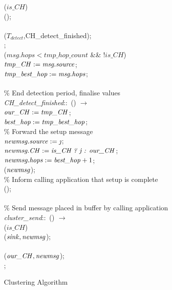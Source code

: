 \begin{figure}[H]
\begin{boxedminipage}{\linewidth}
    \null\qq\qq\qq {} ($is\_CH$)  \\
    \null\qq\qq\qq\qq {}(); \\
    \null\qq\qq\qq {}\\
    \null\qq\qq\qq\qq {}($T_{detect}$,CH\_detect\_finished); \\
    \null\qq\qq {}; \\
    \null\qq\qq {} ($msg.hops < tmp\_hop\_count$ \&\& !$is\_CH$)  \\
    \null\qq\qq\qq $\mbox{\emph{tmp\_CH}} \mathrel{:=} \mbox{\emph{msg.source}}$;\\
    \null\qq\qq\qq $\mbox{\emph{tmp\_best\_hop}} \mathrel{:=} \mbox{\emph{msg.hops}}$;\\~\\
    \null\qq \% End detection period, finalise values\\
    \null\qq \emph{CH\_detect\_finished}::~() $\rightarrow$\\
    \null\qq\qq $\mbox{\emph{our\_CH}} \mathrel{:=} \mbox{\emph{tmp\_CH}}$;\\
    \null\qq\qq $\mbox{\emph{best\_hop}} \mathrel{:=} \mbox{\emph{tmp\_best\_hop}}$;\\
    \null\qq\qq \% Forward the setup message\\
    \null\qq\qq $\var{newmsg.source} \assign \var{\j}$;\\
    \null\qq\qq $\mbox{\emph{newmsg.CH}} \mathrel{:=} \mbox{\emph{is\_CH ? j : our\_CH}}$;\\
    \null\qq\qq $\mbox{\emph{newmsg.hops}} \mathrel{:=} \mbox{\emph{best\_hop}}+1$;\\
    \null\qq\qq {}($\mbox{\emph{newmsg}}$);\\
    \null\qq\qq \% Inform calling application that setup is complete\\
    \null\qq\qq {}();\\~\\
    \null\qq \% Send message placed in buffer by calling application\\
	\null\qq \emph{cluster\_send}::~() $\rightarrow$\\
    \null\qq\qq {} ($is\_CH$)  \\
    \null\qq\qq\qq {}($\mbox{\emph{sink}}, \mbox{\emph{newmsg}}$);\\
    \null\qq\qq {}\\    
    \null\qq\qq\qq {}($\mbox{\emph{our\_CH}}, \mbox{\emph{newmsg}}$);\\
    \null\qq\qq {}; \\
  \end{boxedminipage}
  \caption{Clustering Algorithm}
\end{figure}

